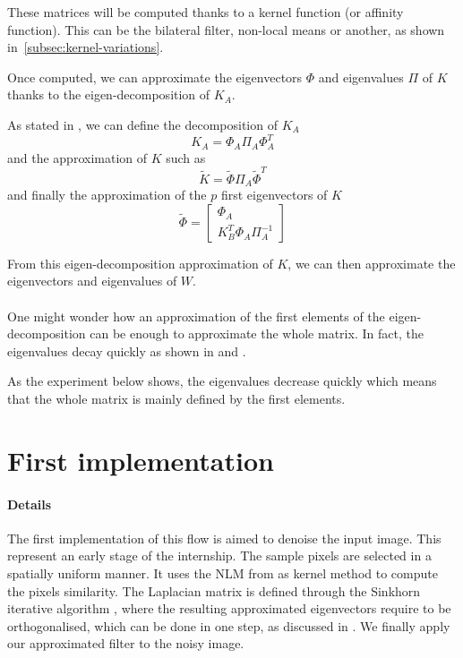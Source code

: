 These matrices will be computed thanks to a kernel function (or affinity function). This can be the bilateral filter, non-local means or another, as shown in~\ref{subsec:kernel-variations}.

Once computed, we can approximate the eigenvectors \(\Phi\) and eigenvalues \(\Pi\) of \(K\) thanks to the eigen-decomposition of \(K_A\).

As stated in \cite{glide_2014}, we can define the decomposition of \(K_A\)
\[K_A = \Phi_A \Pi_A \Phi_A^T\]
and the approximation of \(K\) such as
\[\tilde{K} = \tilde{\Phi} \Pi_A \tilde{\Phi}^T\]
and finally the approximation of the \(p\) first eigenvectors of \(K\)
\[
 \tilde{\Phi} = \begin{bmatrix}
  \Phi_A \\
  K_B^T \Phi_A \Pi_A^{-1}
 \end{bmatrix}
\]

From this eigen-decomposition approximation of \(K\), we can then approximate the eigenvectors and eigenvalues of \(W\).

\paragraph{}
One might wonder how an approximation of the first elements of the eigen-decomposition can be enough to approximate the whole matrix.
In fact, the eigenvalues decay quickly as shown in \cite{siam_slides_2016} and \cite{meyer_perturbation_2014}.

As the experiment below shows, the eigenvalues decrease quickly which means that the whole matrix is mainly defined by the first elements.



\section{First implementation}

\paragraph{Details}
The first implementation of this flow is aimed to denoise the input image.
This represent an early stage of the internship.
The sample pixels are selected in a spatially uniform manner.
It uses the NLM from \cite{buades_review_2005} as kernel method to compute the pixels similarity.
The Laplacian matrix is defined through the Sinkhorn iterative algorithm \cite{milanfar_symmetrizing_2013}, where the resulting approximated eigenvectors require to be orthogonalised, which can be done in one step, as discussed in \cite{fowlkes_spectral_2004}.
We finally apply our approximated filter to the noisy image.

